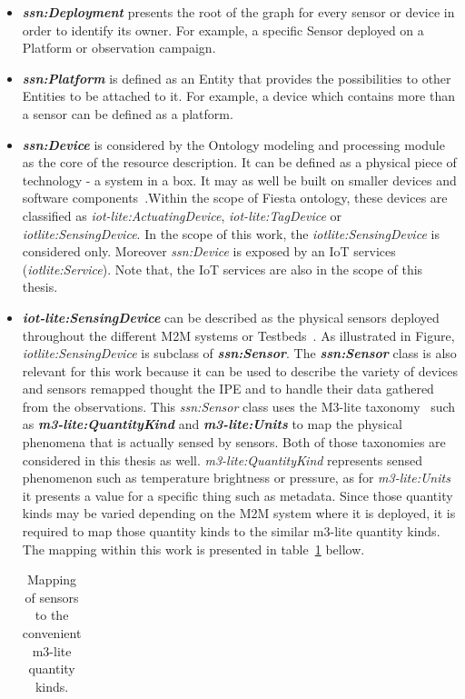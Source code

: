 \begin{itemize}
\item \textbf{\textit{ssn:Deployment}} presents the root of the graph for every sensor or device in order to identify its owner. For example, a specific Sensor deployed on a Platform or observation campaign.
\item \textbf{\textit{ssn:Platform}} is defined as an Entity that provides the possibilities to other Entities to be attached to it. For example, a device which contains more than a sensor can be defined as a platform.
\item \textbf{\textit{ssn:Device}} is considered by the Ontology modeling and processing module as the core of the resource description. It can be defined as a physical piece of technology - a system in a box. It may as well be built on smaller devices and software components~\cite{device}.Within the scope of Fiesta ontology, these devices are classified as \textit{iot-lite:ActuatingDevice}, \textit{iot-lite:TagDevice} or \textit{iotlite:SensingDevice}. In the scope of this work, the \textit{iotlite:SensingDevice} is considered only. Moreover \textit{ssn:Device} is exposed by an IoT services (\textit{iotlite:Service}). Note that, the IoT services are also in the scope of this thesis.
\item \textbf{\textit{iot-lite:SensingDevice}} can be described as the physical sensors deployed throughout the different M2M systems or Testbeds~\cite{fiesta}. As illustrated in Figure, \textit{iotlite:SensingDevice} is subclass of \textbf{\textit{ssn:Sensor}}. The \textbf{\textit{ssn:Sensor}} class is also relevant for this work because it can be used to describe the variety of devices and sensors remapped thought the IPE and to handle their data gathered from the observations. This \textit{ssn:Sensor} class uses the M3-lite taxonomy~\cite{fiestaiot} such as \textbf{\textit{m3-lite:QuantityKind}} and \textbf{\textit{m3-lite:Units}} to map the physical phenomena that is actually sensed by sensors. Both of those taxonomies are considered in this thesis as well. \textit{m3-lite:QuantityKind} represents sensed phenomenon such as temperature brightness or pressure, as for \textit{m3-lite:Units} it presents a value for a specific thing such as metadata. Since those quantity kinds may be varied depending on the M2M system where it is deployed, it is required to map those quantity kinds to the similar m3-lite quantity kinds. The mapping within this work is presented in table~\ref{table:contrib2:map} bellow. 

\begin{table}[htbp]
\centering
\caption{Mapping of sensors to the convenient m3-lite quantity kinds. }
\label{table:contrib2:map}
\begin{tabular}{ll}
 \hline


\end{tabular}
\end{table}
\end{itemize}
